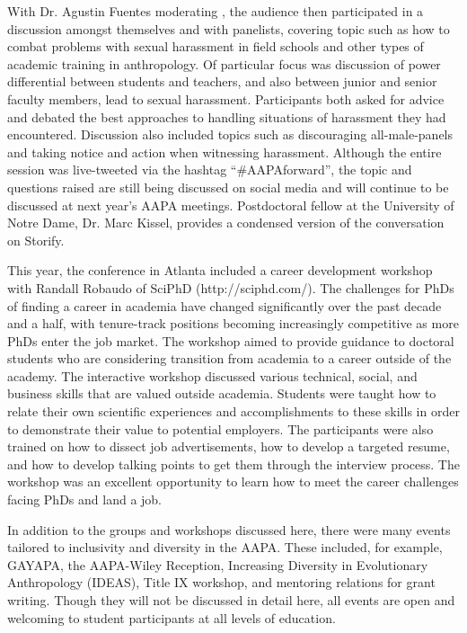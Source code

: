 \documentclass[english]{ijsra}
\begin{document}
With Dr. Agustin Fuentes moderating , the audience then participated in a discussion amongst themselves and with panelists,
covering topic such as how to combat problems with sexual harassment in field schools and 
other types of academic training in anthropology. 
Of particular focus was discussion of power differential between students and teachers,
and also between junior and senior faculty members, lead to sexual harassment. 
Participants both asked for advice and debated the best approaches to handling situations of harassment they had encountered.
Discussion also included topics such as discouraging all-male-panels and taking notice and action when witnessing harassment.
Although the entire session was live-tweeted via the hashtag “#AAPAforward”,%
the topic and questions raised are still being discussed on social media and will continue to
be discussed at next year’s AAPA meetings. 
Postdoctoral fellow at the University of Notre Dame, Dr. Marc Kissel, provides a condensed version of the conversation on Storify.%

This year, the conference in Atlanta included a career development workshop with Randall Robaudo of SciPhD (http://sciphd.com/).%
The challenges for PhDs of finding a career in academia have changed significantly over the past decade and a half,
with tenure-track positions becoming increasingly competitive as more PhDs enter the job market. 
The workshop aimed to provide guidance to doctoral students who are considering transition from academia to
a career outside of the academy. 
The interactive workshop discussed various technical, social, and business skills that are valued outside academia.
Students were taught how to relate their own scientific experiences and accomplishments to these skills in order to
demonstrate their value to potential employers. 
The participants were also trained on how to dissect job advertisements, how to develop a targeted resume,
and how to develop talking points to get them through the interview process. 
The workshop was an excellent opportunity to learn how to meet the career challenges facing PhDs and land a job.

In addition to the groups and workshops discussed here, there were many events tailored to inclusivity and diversity in the AAPA.
These included, for example, GAYAPA, the AAPA-Wiley Reception, Increasing Diversity in Evolutionary Anthropology (IDEAS),
Title IX workshop, and mentoring relations for grant writing.  
Though they will not be discussed in detail here, all events are open and welcoming to student participants at all levels of education.
\end{document}
